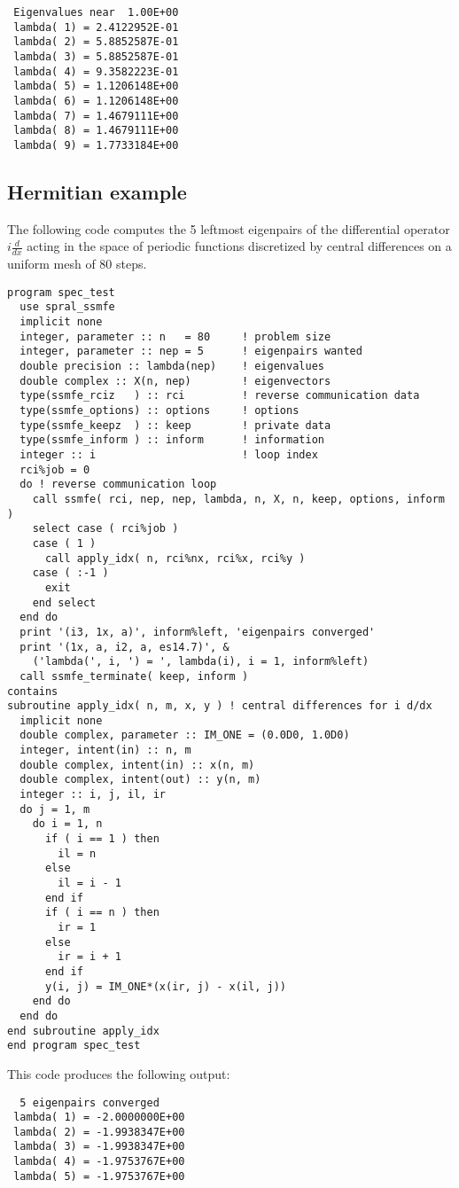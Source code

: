 \begin{verbatim}
 Eigenvalues near  1.00E+00
 lambda( 1) = 2.4122952E-01
 lambda( 2) = 5.8852587E-01
 lambda( 3) = 5.8852587E-01
 lambda( 4) = 9.3582223E-01
 lambda( 5) = 1.1206148E+00
 lambda( 6) = 1.1206148E+00
 lambda( 7) = 1.4679111E+00
 lambda( 8) = 1.4679111E+00
 lambda( 9) = 1.7733184E+00
\end{verbatim}

\subsection{Hermitian example}
\label{sec:ex.h}

The following code 
computes the 5 leftmost eigenpairs of 
the differential operator $i \frac{d}{dx}$
acting in the space of periodic functions
discretized by central differences on a uniform mesh
of 80 steps.

\begin{verbatim}
program spec_test
  use spral_ssmfe
  implicit none
  integer, parameter :: n   = 80     ! problem size
  integer, parameter :: nep = 5      ! eigenpairs wanted
  double precision :: lambda(nep)    ! eigenvalues
  double complex :: X(n, nep)        ! eigenvectors
  type(ssmfe_rciz   ) :: rci         ! reverse communication data
  type(ssmfe_options) :: options     ! options
  type(ssmfe_keepz  ) :: keep        ! private data
  type(ssmfe_inform ) :: inform      ! information
  integer :: i                       ! loop index
  rci%job = 0
  do ! reverse communication loop
    call ssmfe( rci, nep, nep, lambda, n, X, n, keep, options, inform )
    select case ( rci%job )
    case ( 1 )
      call apply_idx( n, rci%nx, rci%x, rci%y )
    case ( :-1 )
      exit
    end select
  end do
  print '(i3, 1x, a)', inform%left, 'eigenpairs converged'
  print '(1x, a, i2, a, es14.7)', &
    ('lambda(', i, ') = ', lambda(i), i = 1, inform%left)
  call ssmfe_terminate( keep, inform )
contains
subroutine apply_idx( n, m, x, y ) ! central differences for i d/dx
  implicit none
  double complex, parameter :: IM_ONE = (0.0D0, 1.0D0)
  integer, intent(in) :: n, m
  double complex, intent(in) :: x(n, m)
  double complex, intent(out) :: y(n, m)
  integer :: i, j, il, ir
  do j = 1, m
    do i = 1, n
      if ( i == 1 ) then
        il = n
      else
        il = i - 1
      end if
      if ( i == n ) then
        ir = 1
      else
        ir = i + 1
      end if
      y(i, j) = IM_ONE*(x(ir, j) - x(il, j))
    end do
  end do
end subroutine apply_idx
end program spec_test
\end{verbatim}

This code produces the following output:

\begin{verbatim}
  5 eigenpairs converged
 lambda( 1) = -2.0000000E+00
 lambda( 2) = -1.9938347E+00
 lambda( 3) = -1.9938347E+00
 lambda( 4) = -1.9753767E+00
 lambda( 5) = -1.9753767E+00
\end{verbatim}






